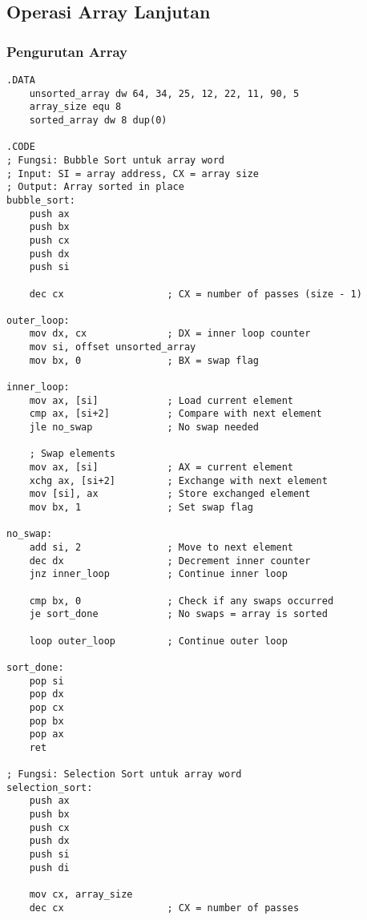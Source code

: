 \documentclass[../main.tex]{subfiles}
\begin{document}
        \subsection{Operasi Array Lanjutan}
            \subsubsection{Pengurutan Array}
                \begin{lstlisting}[language={[x86masm]Assembler}, caption=Pengurutan Array, label={lst:array-sort}]
.DATA
    unsorted_array dw 64, 34, 25, 12, 22, 11, 90, 5
    array_size equ 8
    sorted_array dw 8 dup(0)

.CODE
; Fungsi: Bubble Sort untuk array word
; Input: SI = array address, CX = array size
; Output: Array sorted in place
bubble_sort:
    push ax
    push bx
    push cx
    push dx
    push si
    
    dec cx                  ; CX = number of passes (size - 1)
    
outer_loop:
    mov dx, cx              ; DX = inner loop counter
    mov si, offset unsorted_array
    mov bx, 0               ; BX = swap flag
    
inner_loop:
    mov ax, [si]            ; Load current element
    cmp ax, [si+2]          ; Compare with next element
    jle no_swap             ; No swap needed
    
    ; Swap elements
    mov ax, [si]            ; AX = current element
    xchg ax, [si+2]         ; Exchange with next element
    mov [si], ax            ; Store exchanged element
    mov bx, 1               ; Set swap flag
    
no_swap:
    add si, 2               ; Move to next element
    dec dx                  ; Decrement inner counter
    jnz inner_loop          ; Continue inner loop
    
    cmp bx, 0               ; Check if any swaps occurred
    je sort_done            ; No swaps = array is sorted
    
    loop outer_loop         ; Continue outer loop
    
sort_done:
    pop si
    pop dx
    pop cx
    pop bx
    pop ax
    ret

; Fungsi: Selection Sort untuk array word
selection_sort:
    push ax
    push bx
    push cx
    push dx
    push si
    push di
    
    mov cx, array_size
    dec cx                  ; CX = number of passes
    

\end{lstlisting}
\end{document}
